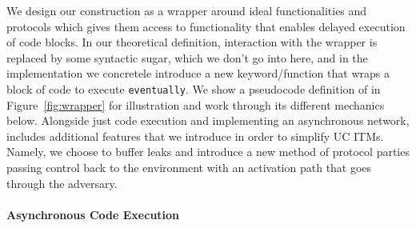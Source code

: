 We design our construction as a wrapper around ideal functionalities and protocols which gives them access to functionality that enables delayed execution of code blocks.
In our theoretical definition, interaction with the wrapper is replaced by some syntactic sugar, which we don't go into here, and in the implementation we concretele introduce a new keyword/function that wraps a block of code to execute \texttt{eventually}.
We show a pseudocode definition of \fwrapper in Figure~\ref{fig:wrapper} for illustration and work through its different mechanics below. 
Alongside just code execution and implementing an asynchronous network, \fwrapper includes additional features that we introduce in order to simplify UC ITMs.
Namely, we choose to buffer leaks and introduce a new method of protocol parties passing control back to the environment with an activation path that goes through the adversary.


\paragraph{Asynchronous Code Execution} 

